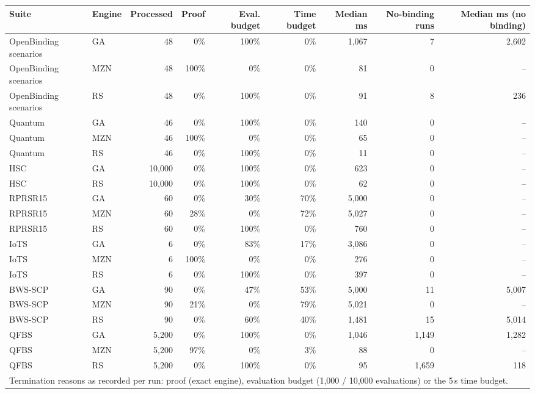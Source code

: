 \begin{tabular}{llrrrrrrr}
\toprule
Suite & Engine & Processed & Proof & Eval. budget & Time budget & Median ms & No-binding runs & Median ms (no binding) \\
\midrule
OpenBinding scenarios & GA & 48 & 0\% & 100\% & 0\% & 1,067 & 7 & 2,602 \\
OpenBinding scenarios & MZN & 48 & 100\% & 0\% & 0\% & 81 & 0 & -- \\
OpenBinding scenarios & RS & 48 & 0\% & 100\% & 0\% & 91 & 8 & 236 \\
Quantum & GA & 46 & 0\% & 100\% & 0\% & 140 & 0 & -- \\
Quantum & MZN & 46 & 100\% & 0\% & 0\% & 65 & 0 & -- \\
Quantum & RS & 46 & 0\% & 100\% & 0\% & 11 & 0 & -- \\
HSC & GA & 10,000 & 0\% & 100\% & 0\% & 623 & 0 & -- \\
HSC & RS & 10,000 & 0\% & 100\% & 0\% & 62 & 0 & -- \\
RPRSR15 & GA & 60 & 0\% & 30\% & 70\% & 5,000 & 0 & -- \\
RPRSR15 & MZN & 60 & 28\% & 0\% & 72\% & 5,027 & 0 & -- \\
RPRSR15 & RS & 60 & 0\% & 100\% & 0\% & 760 & 0 & -- \\
IoTS & GA & 6 & 0\% & 83\% & 17\% & 3,086 & 0 & -- \\
IoTS & MZN & 6 & 100\% & 0\% & 0\% & 276 & 0 & -- \\
IoTS & RS & 6 & 0\% & 100\% & 0\% & 397 & 0 & -- \\
BWS-SCP & GA & 90 & 0\% & 47\% & 53\% & 5,000 & 11 & 5,007 \\
BWS-SCP & MZN & 90 & 21\% & 0\% & 79\% & 5,021 & 0 & -- \\
BWS-SCP & RS & 90 & 0\% & 60\% & 40\% & 1,481 & 15 & 5,014 \\
QFBS & GA & 5,200 & 0\% & 100\% & 0\% & 1,046 & 1,149 & 1,282 \\
QFBS & MZN & 5,200 & 97\% & 0\% & 3\% & 88 & 0 & -- \\
QFBS & RS & 5,200 & 0\% & 100\% & 0\% & 95 & 1,659 & 118 \\
\bottomrule
\multicolumn{9}{l}{\footnotesize Termination reasons as recorded per run: proof (exact engine), evaluation budget (1,000 / 10,000 evaluations) or the 5\,s time budget.}
\end{tabular}
